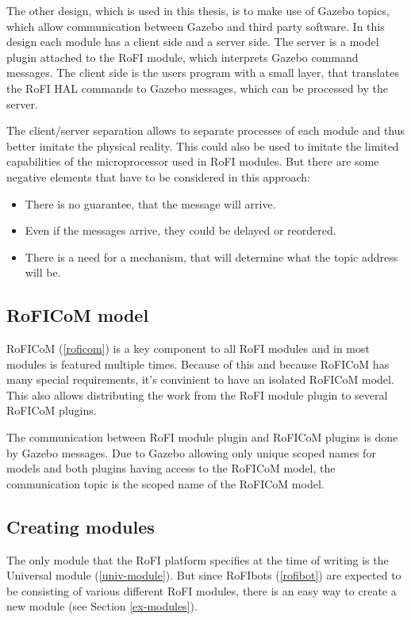 \documentclass[
  digital, %
  table,   %
  oneside, %
  nolof,     %
  nolot,     %
]{fithesis3}
\begin{document}
The other design, which is used in this thesis, is to make use of Gazebo topics, which allow communication between Gazebo and third party software.
In this design each module has a client side and a server side.
The server is a model plugin attached to the RoFI module, which interprets Gazebo command messages.
The client side is the users program with a small layer, that translates the RoFI HAL commands to Gazebo messages, which can be processed by the server.

The client/server separation allows to separate processes of each module and thus better imitate the physical reality.
This could also be used to imitate the limited capabilities of the microprocessor used in RoFI modules.
But there are some negative elements that have to be considered in this approach:
\begin{itemize}
    \item There is no guarantee, that the message will arrive.
    \item Even if the messages arrive, they could be delayed or reordered.
    \item There is a need for a mechanism, that will determine what the topic address will be.
\end{itemize}

\subsection{RoFICoM model}

RoFICoM (\ref{roficom}) is a key component to all RoFI modules and in most modules is featured multiple times.
Because of this and because RoFICoM has many special requirements, it's convinient to have an isolated RoFICoM model.
This also allows distributing the work from the RoFI module plugin to several RoFICoM plugins.

The communication between RoFI module plugin and RoFICoM plugins is done by Gazebo messages.
Due to Gazebo allowing only unique scoped names for models and both plugins having access to the RoFICoM model, the communication topic is the scoped name of the RoFICoM model.

\subsection{Creating modules}

The only module that the RoFI platform specifies at the time of writing is the Universal module (\ref{univ-module}).
But since RoFIbots (\ref{rofibot}) are expected to be consisting of various different RoFI modules, there is an easy way to create a new module (see Section \ref{ex-modules}).
\end{document}
